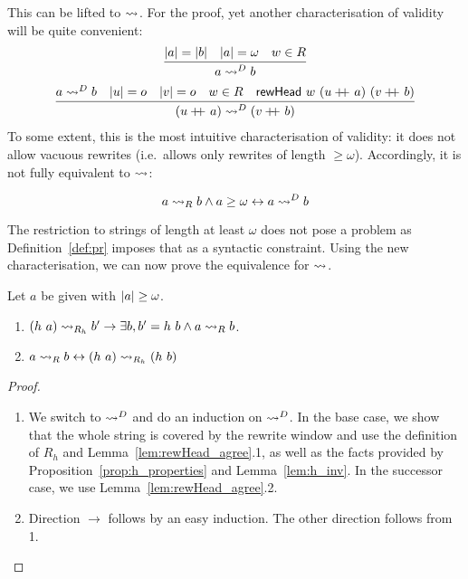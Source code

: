This can be lifted to $\strent{}$. For the proof, yet another characterisation of validity will be quite convenient:
\begin{gather*}
  \infer{a \strentD{R} b}{\length{a} = \length{b} \quad \length{a} = \omega \quad w \in R}
  \\
  \infer{(u \concat a) \strentD{R} (v \concat b)}{a \strentD{R} b \quad \length{u} = o \quad \length{v} = o \quad w \in R \quad \rewHead{w}{(u \concat a)}{(v \concat b)}}
\end{gather*}
To some extent, this is the most intuitive characterisation of validity: it does not allow vacuous rewrites (i.e.\ allows only rewrites of length $\ge \omega$). Accordingly, it is not fully equivalent to $\strent{}$:
\begin{lemma}
  \[a \strent{R} b \land a \ge \omega \leftrightarrow a \strentD{R} b \]
\end{lemma}

The restriction to strings of length at least $\omega$ does not pose a problem as Definition~\ref{def:pr} imposes that as a syntactic constraint.
Using the new characterisation, we can now prove the equivalence for $\strent{}$.
\begin{lemma}
  Let $a$ be given with $\length{a} \ge \omega$.
  \begin{enumerate}
    \item $(h~a) \strent{R_h} b' \rightarrow \exists b, b' = h~b \land a \strent{R} b$. 
    \item $a \strent{R} b \leftrightarrow (h~a) \strent{R_h} (h~b)$
  \end{enumerate}
\end{lemma}
\begin{proof}
  \begin{enumerate}
    \item We switch to $\strentD{}$ and do an induction on $\strentD{}$. In the base case, we show that the whole string is covered by the rewrite window and use the definition of $R_h$ and Lemma~\ref{lem:rewHead_agree}.1, as well as the facts provided by Proposition~\ref{prop:h_properties} and Lemma~\ref{lem:h_inv}.
      In the successor case, we use Lemma~\ref{lem:rewHead_agree}.2.
    \item Direction $\rightarrow$ follows by an easy induction. The other direction follows from 1.
  \end{enumerate}
\end{proof}

